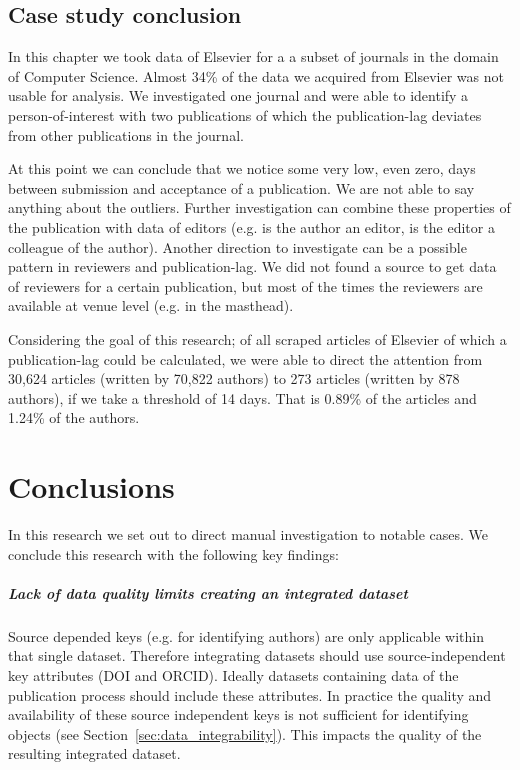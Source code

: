 \documentclass{ou-report}
\newcommand{\doi}{{DOI}}
\newcommand{\orcid}{ORCID}
\begin{document}
\section{Case study conclusion}
In this chapter we took data of Elsevier for a a subset of journals in the
domain of Computer Science. Almost 34\% of the data we acquired from Elsevier 
was not usable for analysis. 
%
We investigated one journal and were able to identify a 
person-of-interest with two publications of which the publication-lag deviates
from other publications in the journal.

At this point we can conclude that we notice some very low, even zero, days 
between submission and acceptance of a publication. We are not able to say 
anything about the outliers. Further 
investigation can combine these properties of the publication with data of 
editors (e.g.
is the author an editor, is the editor a colleague of the author). Another
direction to investigate can be a possible pattern in reviewers and 
publication-lag. We did not found a source to get data of reviewers for a 
certain publication, but most of the times the reviewers are available at venue 
level (e.g. in the masthead).

Considering the goal of this research; of all scraped articles of Elsevier of 
which a publication-lag could be calculated, we were able to direct the attention 
from 30,624 articles (written by 70,822 authors) to 273 articles (written by 878 
authors), if we take a threshold of 14 days. That is 0.89\% of the articles and 
1.24\% of the authors.

\chapter{Conclusions}
\label{chp:conclusions}

In this research we set out to direct manual investigation to notable cases.
We conclude this research with the following key findings:

\paragraph{Lack of data quality limits creating an integrated dataset}
Source depended keys (e.g. for identifying authors) are only applicable within 
that single dataset. Therefore integrating datasets should use 
source-independent key attributes (\doi{} and \orcid{}). Ideally datasets 
containing data of the publication process should include these attributes. In 
practice the quality and availability of these source independent keys is not 
sufficient for identifying objects (see Section~\ref{sec:data_integrability}). 
This impacts the quality of the resulting integrated dataset.
\end{document}

